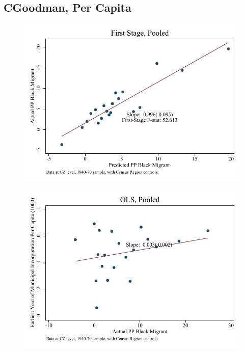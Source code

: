 \documentclass{article}
\begin{document}
\subsection{CGoodman, Per Capita}

\clearpage
\begin{figure}
\centering
\includegraphics{figures/simplefigs/pooled_cgoodman_pc_C3_fs.pdf}
\end{figure}
\clearpage
\begin{figure}
\centering
\includegraphics{figures/simplefigs/pooled_cgoodman_pc_C3_ols.pdf}
\end{figure}
\clearpage
\end{document}
